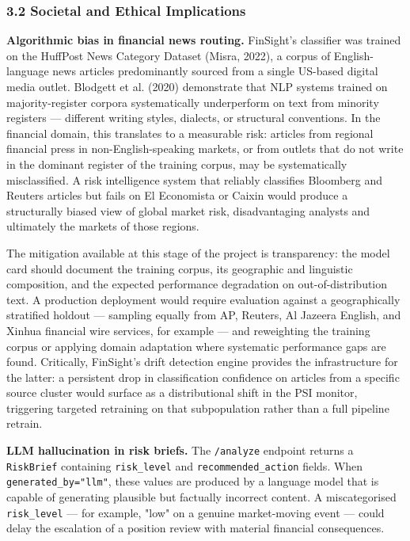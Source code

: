 \documentclass[11pt,a4paper]{article}
\begin{document}
\subsubsection*{3.2 Societal and Ethical Implications}

\textbf{Algorithmic bias in financial news routing.}
FinSight's classifier was trained on the HuffPost News Category Dataset (Misra, 2022), a corpus of English-language news articles predominantly sourced from a single US-based digital media outlet. Blodgett et al. (2020) demonstrate that NLP systems trained on majority-register corpora systematically underperform on text from minority registers — different writing styles, dialects, or structural conventions. In the financial domain, this translates to a measurable risk: articles from regional financial press in non-English-speaking markets, or from outlets that do not write in the dominant register of the training corpus, may be systematically misclassified. A risk intelligence system that reliably classifies Bloomberg and Reuters articles but fails on El Economista or Caixin would produce a structurally biased view of global market risk, disadvantaging analysts and ultimately the markets of those regions.

The mitigation available at this stage of the project is transparency: the model card should document the training corpus, its geographic and linguistic composition, and the expected performance degradation on out-of-distribution text. A production deployment would require evaluation against a geographically stratified holdout — sampling equally from AP, Reuters, Al Jazeera English, and Xinhua financial wire services, for example — and reweighting the training corpus or applying domain adaptation where systematic performance gaps are found. Critically, FinSight's drift detection engine provides the infrastructure for the latter: a persistent drop in classification confidence on articles from a specific source cluster would surface as a distributional shift in the PSI monitor, triggering targeted retraining on that subpopulation rather than a full pipeline retrain.

\textbf{LLM hallucination in risk briefs.}
The \texttt{/analyze} endpoint returns a \texttt{RiskBrief} containing \texttt{risk\_level} and \texttt{recommended\_action} fields. When \texttt{generated\_by="llm"}, these values are produced by a language model that is capable of generating plausible but factually incorrect content. A miscategorised \texttt{risk\_level} — for example, "low" on a genuine market-moving event — could delay the escalation of a position review with material financial consequences.
\end{document}
